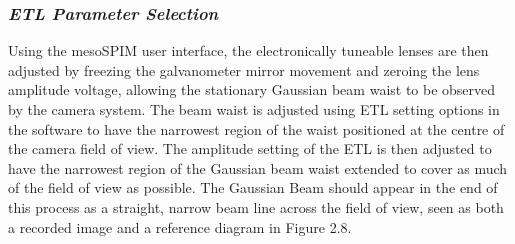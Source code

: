 \subsubsection{\textit{ETL Parameter Selection}}
Using the mesoSPIM user interface, the electronically tuneable lenses are then adjusted by freezing the galvanometer mirror movement and zeroing the lens amplitude voltage, allowing the stationary Gaussian beam waist to be observed by the camera system. The beam waist is adjusted using ETL setting options in the software to have the narrowest region of the waist positioned at the centre of the camera field of view. The amplitude setting of the ETL is then adjusted to have the narrowest region of the Gaussian beam waist extended to cover as much of the field of view as possible. The Gaussian Beam should appear in the end of this process as a straight, narrow beam line across the field of view, seen as both a recorded image and a reference diagram in Figure 2.8.

